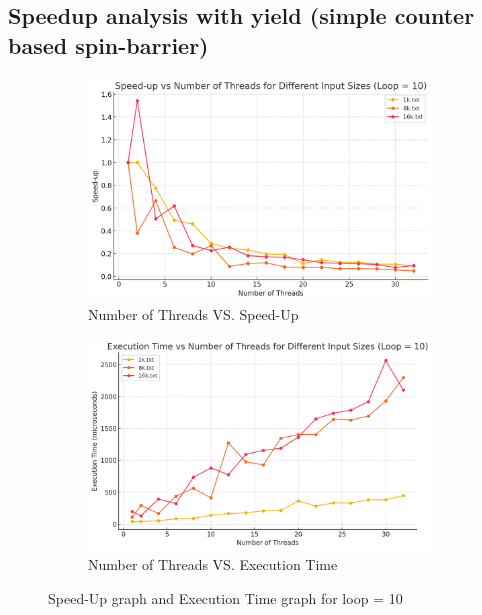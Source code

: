 \documentclass[letterpaper,12pt]{article}
\theoremstyle{remark}
\begin{document}
\subsection{Speedup analysis with yield (simple counter based spin-barrier) }

\begin{figure}[H]
    \centering
    \begin{subfigure}[t]{0.48\textwidth}  %
        \centering
        \includegraphics[width=\textwidth]{loop10Yield.png}
        \caption{Number of Threads VS. Speed-Up}
        \label{fig:ThreadVsSpeedUp1}
    \end{subfigure}
    \hfill  %
    \begin{subfigure}[t]{0.48\textwidth}  %
        \centering
        \includegraphics[width=\textwidth]{loop10YieldExecutionTime.png}
        \caption{Number of Threads VS. Execution Time}
        \label{fig:ThreadVsExecutionTime}
    \end{subfigure}
    \caption{Speed-Up graph and Execution Time graph for loop = 10}
    \label{fig:ThreadVsComparison}
\end{figure}
\end{document}
